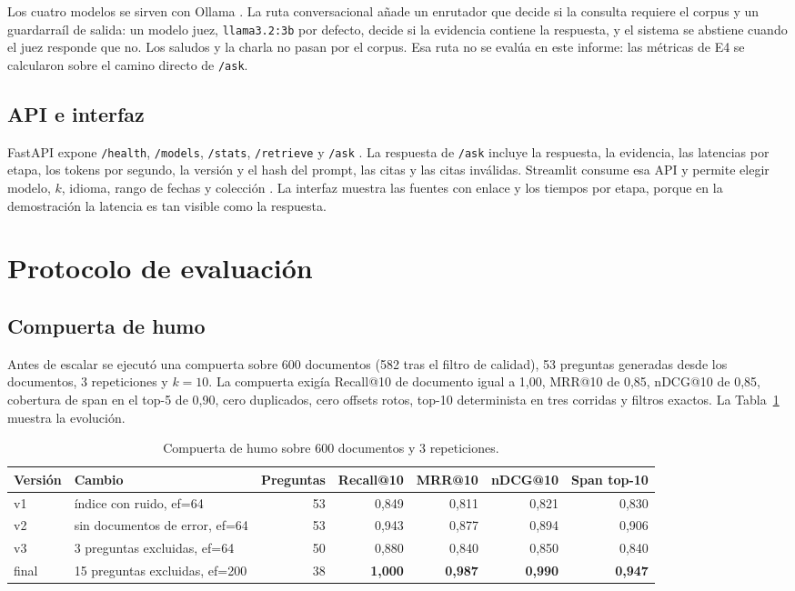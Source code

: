 \documentclass[11pt]{tg_usta}
\begin{document}
Los cuatro modelos se sirven con Ollama \cite{ollamadocs}. La ruta conversacional añade un enrutador que decide si la consulta requiere el corpus y un guardarraíl de salida: un modelo juez, \texttt{llama3.2:3b} por defecto, decide si la evidencia contiene la respuesta, y el sistema se abstiene cuando el juez responde que no. Los saludos y la charla no pasan por el corpus. Esa ruta no se evalúa en este informe: las métricas de E4 se calcularon sobre el camino directo de \texttt{/ask}.

\subsection{API e interfaz}

FastAPI expone \texttt{/health}, \texttt{/models}, \texttt{/stats}, \texttt{/retrieve} y \texttt{/ask} \cite{fastapidocs}. La respuesta de \texttt{/ask} incluye la respuesta, la evidencia, las latencias por etapa, los tokens por segundo, la versión y el hash del prompt, las citas y las citas inválidas. Streamlit consume esa API y permite elegir modelo, $k$, idioma, rango de fechas y colección \cite{streamlitdocs}. La interfaz muestra las fuentes con enlace y los tiempos por etapa, porque en la demostración la latencia es tan visible como la respuesta.

\section{Protocolo de evaluación}

\subsection{Compuerta de humo}

Antes de escalar se ejecutó una compuerta sobre 600 documentos (582 tras el filtro de calidad), 53 preguntas generadas desde los documentos, 3 repeticiones y $k=10$. La compuerta exigía Recall@10 de documento igual a 1,00, MRR@10 de 0,85, nDCG@10 de 0,85, cobertura de span en el top-5 de 0,90, cero duplicados, cero offsets rotos, top-10 determinista en tres corridas y filtros exactos. La Tabla~\ref{tab:humo} muestra la evolución.

\begin{table}[htbp]
\centering
\footnotesize
\begin{tabular}{@{}llrrrrr@{}}
\toprule
Versión & Cambio & Preguntas & Recall@10 & MRR@10 & nDCG@10 & Span top-10 \\
\midrule
v1 & índice con ruido, ef=64 & 53 & 0,849 & 0,811 & 0,821 & 0,830 \\
v2 & sin documentos de error, ef=64 & 53 & 0,943 & 0,877 & 0,894 & 0,906 \\
v3 & 3 preguntas excluidas, ef=64 & 50 & 0,880 & 0,840 & 0,850 & 0,840 \\
final & 15 preguntas excluidas, ef=200 & 38 & \textbf{1,000} & \textbf{0,987} & \textbf{0,990} & \textbf{0,947} \\
\bottomrule
\end{tabular}
\caption{Compuerta de humo sobre 600 documentos y 3 repeticiones.}
\label{tab:humo}
\end{table}
\end{document}
